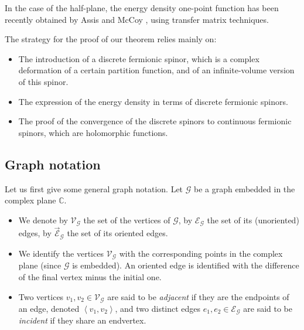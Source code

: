 \documentclass[oneside,english]{amsart}
\numberwithin{equation}{section}
\numberwithin{figure}{section}
\theoremstyle{plain}
\theoremstyle{plain}
\theoremstyle{plain}
\theoremstyle{plain}
\theoremstyle{plain}
\theoremstyle{definition}
\theoremstyle{remark}
\begin{document}
In the case of the half-plane, the energy density one-point function
has been recently obtained by Assis and McCoy \cite{assis-mccoy},
using transfer matrix techniques. 

The strategy for the proof of our theorem relies mainly on:
\begin{itemize}
\item The introduction of a discrete fermionic spinor, which is a complex
deformation of a certain partition function, and of an infinite-volume
version of this spinor.
\item The expression of the energy density in terms of discrete fermionic
spinors.
\item The proof of the convergence of the discrete spinors to continuous
fermionic spinors, which are holomorphic functions.
\end{itemize}

\subsection{Graph notation\label{sub:graph-notation}}

Let us first give some general graph notation. Let $\mathcal{G}$
be a graph embedded in the complex plane $\mathbb{C}$.
\begin{itemize}
\item We denote by $\mathcal{V}_{\mathcal{G}}$ the set of the vertices
of $\mathcal{G}$, by $\mathcal{E}_{\mathcal{G}}$ the set of its
(unoriented) edges, by $\vec{\mathcal{E}}_{\mathcal{G}}$ the set
of its oriented edges.
\item We identify the vertices $\mathcal{V}_{\mathcal{G}}$ with the corresponding
points in the complex plane (since $\mathcal{G}$ is embedded). An
oriented edge is identified with the difference of the final vertex
minus the initial one.
\item Two vertices $v_{1},v_{2}\in\mathcal{V}_{\mathcal{G}}$ are said to
be \emph{adjacent} if they are the endpoints of an edge, denoted $\left\langle v_{1},v_{2}\right\rangle $,
and two distinct edges $e_{1},e_{2}\in\mathcal{E}_{\mathcal{G}}$
are said to be \emph{incident} if they share an endvertex.
\end{itemize}
\end{document}
